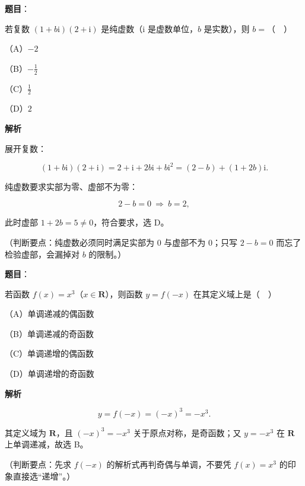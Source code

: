 \begin{answer}

\textbf{题目}：

若复数 $(1+b\mathrm i)(2+\mathrm i)$ 是纯虚数（$\mathrm i$ 是虚数单位，$b$ 是实数），则 $b=$（　）

（A）$-2$

（B）$-\frac12$

（C）$\frac12$

（D）$2$

\textbf{解析}

展开复数：

\nopagebreak[4]
\[(1+b\mathrm i)(2+\mathrm i)=2+\mathrm i+2b\mathrm i+b\mathrm i^2=(2-b)+(1+2b)\mathrm i.\]

纯虚数要求实部为零、虚部不为零：

\nopagebreak[4]
\[2-b=0\ \Rightarrow\ b=2,\]

此时虚部 $1+2b=5\neq0$，符合要求，选 D。

（判断要点：纯虚数必须同时满足实部为 $0$ 与虚部不为 $0$；只写 $2-b=0$ 而忘了检验虚部，会漏掉对 $b$ 的限制。）


\end{answer}
\begin{answer}

\textbf{题目}：

若函数 $f(x)=x^3$（$x\in\mathbf R$），则函数 $y=f(-x)$ 在其定义域上是（　）

（A）单调递减的偶函数

（B）单调递减的奇函数

（C）单调递增的偶函数

（D）单调递增的奇函数

\textbf{解析}

\nopagebreak[4]
\[y=f(-x)=(-x)^3=-x^3.\]

其定义域为 $\mathbf R$，且 $(-x)^3=-x^3$ 关于原点对称，是奇函数；又 $y=-x^3$ 在 $\mathbf R$ 上单调递减，故选 B。

（判断要点：先求 $f(-x)$ 的解析式再判奇偶与单调，不要凭 $f(x)=x^3$ 的印象直接选“递增”。）


\end{answer}
